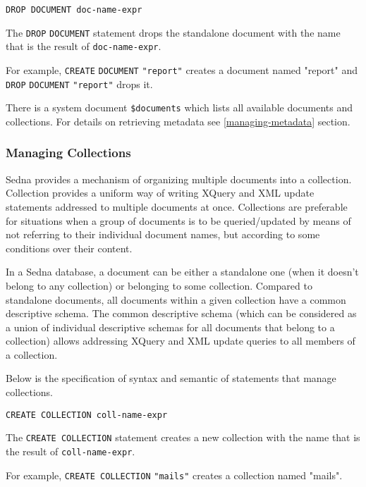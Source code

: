 \documentclass[a4paper,12pt]{article}
\begin{document}
\begin{verbatim}
DROP DOCUMENT doc-name-expr
\end{verbatim}

The \verb!DROP! \verb!DOCUMENT! statement drops the standalone document with the
name that is the result of \verb!doc-name-expr!.

For example, \verb!CREATE! \verb!DOCUMENT! \verb!"report"! creates a document named "report" and \verb!DROP! \verb!DOCUMENT! \verb!"report"! drops it.

\hbox{}

There is a system document \verb!$documents! which lists all available documents and collections. For details on retrieving metadata see \ref{managing-metadata} section.


\subsubsection{Managing Collections}

Sedna provides a mechanism of organizing multiple documents into a collection.
Collection provides a uniform way of writing XQuery and XML update statements
addressed to multiple documents at once.
Collections are preferable for situations when a group of documents is to be
queried/updated by means of not referring to their individual document names,
but according to some conditions over their content.

In a Sedna database, a document can be either a standalone one (when it
doesn't belong to any collection) or belonging to some collection.
Compared to standalone documents, all documents within a given collection have
a common descriptive schema.
The common descriptive schema (which can be considered as a union of
individual descriptive schemas for all documents that belong to a collection)
allows addressing XQuery and XML update queries to all members of a collection.

Below is the specification of syntax and semantic of statements that manage
collections.

\begin{verbatim}CREATE COLLECTION coll-name-expr\end{verbatim}

The \verb!CREATE COLLECTION! statement creates a new collection with the
name that is the result of \verb!coll-name-expr!.

For example, \verb!CREATE COLLECTION! \verb!"mails"! creates a collection named "mails".
\end{document}
